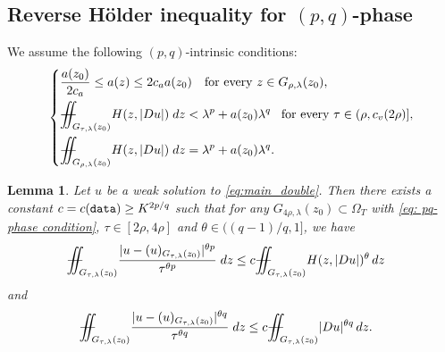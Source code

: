 \documentclass[notitlepage,11pt,reqno]{amsart}
\newtheorem{lemma}[theorem]{Lemma}
\theoremstyle{definition}
\numberwithin{equation}{section}
\newcommand{\iintss}{{\int\hspace{-0.28cm}\int}}
\newcommand{ \miints }{{\iintss\hspace{-0.56cm} -\hspace{-0.15cm}-}}
\newcommand{\miint}[1]{{\miints_{\hspace{-0.13cm}#1}}}
\begin{document}
\subsection{Reverse H\"{o}lder inequality for $(p, q)$-phase}  We assume the following $(p, q)$-intrinsic conditions:
\begin{equation}    \label{eq: pq-phase condition}
    \left\{
    \begin{aligned}
        &\frac{a(z_0)}{2c_a}\leq a(z)\leq 2c_a a(z_0)\quad \text{for every $z \in G_{\rho, \lambda}(z_0)$,}\\
        &\miint{G_{\tau,\lambda}(z_0)} H(z,|Du|) \; dz <\lambda^p+a(z_0)\lambda^q \ \, \text{ for every }\tau\in(\rho,c_v(2\rho)],\\
        &\miint{G_{\rho,\lambda}(z_0)} H(z,|Du|) \; dz =\lambda^p+a(z_0)\lambda^q.
    \end{aligned}
    \right.
\end{equation}
\begin{lemma}\label{Lemma 3.13}
Let $u$ be a weak solution to \eqref{eq:main_double}. Then there exists a constant $c=c(\textnormal{\texttt{data}}) \geq K^{2p/q}$ such that for any $G_{4\rho,\lambda}(z_0)\subset \Omega_T$ with \eqref{eq: pq-phase condition}, $\tau \in [2\rho,4\rho]$ and $\theta \in ((q-1)/q,1]$, we have
\begin{align}\label{Eq 3.10}
&\miint{G_{\tau,\lambda}(z_0)} \frac{|u-(u)_{G_{\tau,\lambda}(z_0)}|^{\theta p}}{\tau^{\theta p}}\; dz \leq c \miint{G_{\tau,\lambda}(z_0)} H(z, |Du|)^{\theta}\, dz
\end{align}
and 
\begin{align}\label{Eq: 3.11}
&\miint{G_{\tau,\lambda}(z_0)} \frac{|u-(u)_{G_{\tau,\lambda}(z_0)}|^{\theta q}}{\tau^{\theta q}}\; dz \leq c \miint{G_{\tau,\lambda}(z_0)} |Du|^{\theta q}\, dz.
\end{align}
\end{lemma}
\end{document}
